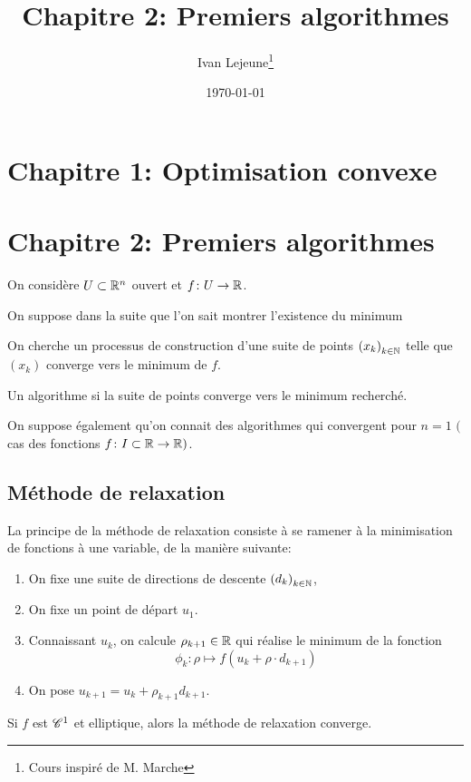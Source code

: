 \documentclass[french,a4paper,10pt]{article}
\title{\color{astral} \sffamily \bfseries Chapitre 2: Premiers algorithmes}
\author{Ivan Lejeune\thanks{Cours inspiré de M. Marche}}
\date{\today}
\begin{document}
	
	\maketitle
	\section{Chapitre 1: Optimisation convexe}
	\section{Chapitre 2: Premiers algorithmes}

	On considère $U\subset\mathbb{R}^n$ ouvert et $f\colon U\to\mathbb{R}$.
	
	On suppose dans la suite que l'on sait montrer l'existence du minimum

	On cherche un processus de construction d'une suite de points ${(x_k)}_{k\in\mathbb{N}}$ 
	telle que $(x_k)$ converge vers le minimum de $f$.

	\begin{oc-definition}
		Un algorithme  si la suite de points converge vers le
		minimum recherché.

	\end{oc-definition}

	On suppose également qu'on connait des algorithmes qui convergent pour $n=1$
	$($cas des fonctions $f\colon I\subset \mathbb{R}\to\mathbb{R})$.

	\subsection{Méthode de relaxation}

	La principe de la méthode de relaxation consiste à se ramener à la
	minimisation de fonctions à une variable, de la manière suivante:

	\begin{enumerate}[label=$(\roman*)$]
		\item On fixe une suite de directions de descente ${(d_k)}_{k\in\mathbb{N}}$,
		\item On fixe un point de départ $u_1$.
		\item Connaissant $u_k$, on calcule $\rho_{k+1}\in\mathbb{R}$ qui réalise le minimum de la fonction
			\[
				\phi_k\colon \rho\mapsto f(u_k+\rho\cdot d_{k+1})
			\]
		\item On pose $u_{k+1}=u_k+\rho_{k+1}d_{k+1}$.
	\end{enumerate}

	\begin{oc-theorem}
		Si $f$ est $\mathscr{C}^1$ et elliptique, alors la méthode de relaxation converge.
	\end{oc-theorem}
\end{document}
